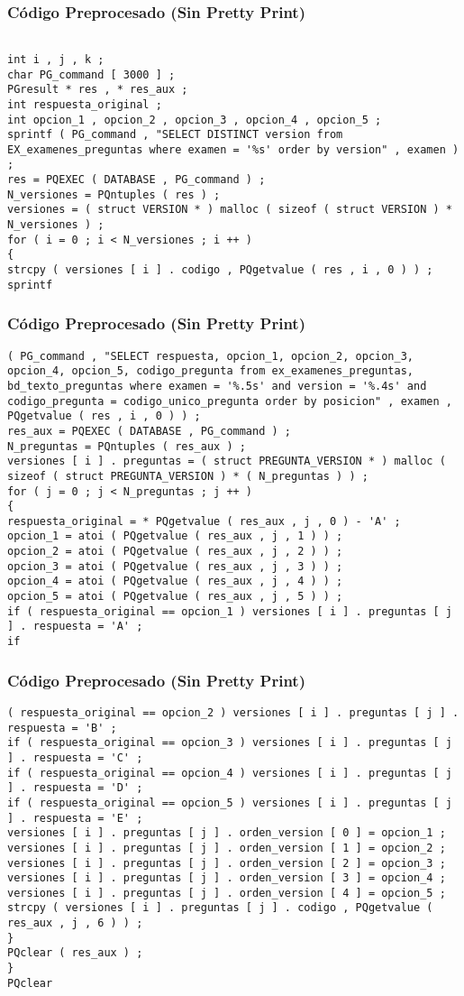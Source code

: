 \documentclass{beamer}
\begin{document}
\begin{frame}[fragile]
\frametitle{C\'odigo Preprocesado (Sin Pretty Print)}
\begin{lstlisting}[style=CStyle]

int i , j , k ; 
char PG_command [ 3000 ] ; 
PGresult * res , * res_aux ; 
int respuesta_original ; 
int opcion_1 , opcion_2 , opcion_3 , opcion_4 , opcion_5 ; 
sprintf ( PG_command , "SELECT DISTINCT version from EX_examenes_preguntas where examen = '%s' order by version" , examen ) ; 
res = PQEXEC ( DATABASE , PG_command ) ; 
N_versiones = PQntuples ( res ) ; 
versiones = ( struct VERSION * ) malloc ( sizeof ( struct VERSION ) * N_versiones ) ; 
for ( i = 0 ; i < N_versiones ; i ++ ) 
{ 
strcpy ( versiones [ i ] . codigo , PQgetvalue ( res , i , 0 ) ) ; 
sprintf \end{lstlisting}
\end{frame}
\begin{frame}[fragile]
\frametitle{C\'odigo Preprocesado (Sin Pretty Print)}
\begin{lstlisting}[style=CStyle]
( PG_command , "SELECT respuesta, opcion_1, opcion_2, opcion_3, opcion_4, opcion_5, codigo_pregunta from ex_examenes_preguntas, bd_texto_preguntas where examen = '%.5s' and version = '%.4s' and codigo_pregunta = codigo_unico_pregunta order by posicion" , examen , PQgetvalue ( res , i , 0 ) ) ; 
res_aux = PQEXEC ( DATABASE , PG_command ) ; 
N_preguntas = PQntuples ( res_aux ) ; 
versiones [ i ] . preguntas = ( struct PREGUNTA_VERSION * ) malloc ( sizeof ( struct PREGUNTA_VERSION ) * ( N_preguntas ) ) ; 
for ( j = 0 ; j < N_preguntas ; j ++ ) 
{ 
respuesta_original = * PQgetvalue ( res_aux , j , 0 ) - 'A' ; 
opcion_1 = atoi ( PQgetvalue ( res_aux , j , 1 ) ) ; 
opcion_2 = atoi ( PQgetvalue ( res_aux , j , 2 ) ) ; 
opcion_3 = atoi ( PQgetvalue ( res_aux , j , 3 ) ) ; 
opcion_4 = atoi ( PQgetvalue ( res_aux , j , 4 ) ) ; 
opcion_5 = atoi ( PQgetvalue ( res_aux , j , 5 ) ) ; 
if ( respuesta_original == opcion_1 ) versiones [ i ] . preguntas [ j ] . respuesta = 'A' ; 
if \end{lstlisting}
\end{frame}
\begin{frame}[fragile]
\frametitle{C\'odigo Preprocesado (Sin Pretty Print)}
\begin{lstlisting}[style=CStyle]
( respuesta_original == opcion_2 ) versiones [ i ] . preguntas [ j ] . respuesta = 'B' ; 
if ( respuesta_original == opcion_3 ) versiones [ i ] . preguntas [ j ] . respuesta = 'C' ; 
if ( respuesta_original == opcion_4 ) versiones [ i ] . preguntas [ j ] . respuesta = 'D' ; 
if ( respuesta_original == opcion_5 ) versiones [ i ] . preguntas [ j ] . respuesta = 'E' ; 
versiones [ i ] . preguntas [ j ] . orden_version [ 0 ] = opcion_1 ; 
versiones [ i ] . preguntas [ j ] . orden_version [ 1 ] = opcion_2 ; 
versiones [ i ] . preguntas [ j ] . orden_version [ 2 ] = opcion_3 ; 
versiones [ i ] . preguntas [ j ] . orden_version [ 3 ] = opcion_4 ; 
versiones [ i ] . preguntas [ j ] . orden_version [ 4 ] = opcion_5 ; 
strcpy ( versiones [ i ] . preguntas [ j ] . codigo , PQgetvalue ( res_aux , j , 6 ) ) ; 
} 
PQclear ( res_aux ) ; 
} 
PQclear \end{lstlisting}
\end{frame}
\end{document}
